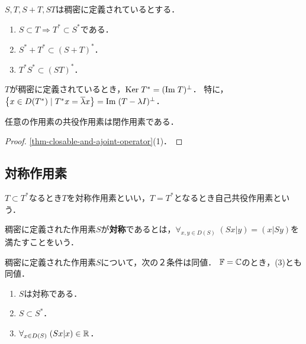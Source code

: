 \documentclass[uplatex,dvipdfmx]{jsreport}
\begin{document}
\begin{lemma}
    $S,T,S+T,ST$は稠密に定義されているとする．
    \begin{enumerate}
        \item $S\subset T\Rightarrow T^*\subset S^*$である．
        \item $S^*+T^*\subset(S+T)^*$．
        \item $T^*S^*\subset(ST)^*$．
    \end{enumerate}
\end{lemma}

\begin{lemma}
    $T$が稠密に定義されているとき，$\mathrm{Ker}\; T^*=(\mathrm{Im}\; T)^\perp$．
    特に，$\left\{x\in D(T^*)\mid T^*x=\overline{\lambda}x\right\}=\mathrm{Im}\;(T-\lambda I)^\perp$．
\end{lemma}

\begin{lemma}
    任意の作用素の共役作用素は閉作用素である．
\end{lemma}
\begin{proof}
    \ref{thm-closable-and-ajoint-operator}(1)．
\end{proof}

\subsection{対称作用素}

\begin{tcolorbox}[colframe=ForestGreen, colback=ForestGreen!10!white,breakable,colbacktitle=ForestGreen!40!white,coltitle=black,fonttitle=\bfseries\sffamily,
title=]
    $T\subset T^*$なるとき$T$を対称作用素といい，$T=T^*$となるとき自己共役作用素という．
\end{tcolorbox}

\begin{definition}[symmetric]
    稠密に定義された作用素$S$が\textbf{対称}であるとは，$\forall_{x,y\in D(S)}\;(Sx|y)=(x|Sy)$を満たすことをいう．
\end{definition}

\begin{lemma}[対称作用素の随伴による特徴付け]
    稠密に定義された作用素$S$について，次の２条件は同値．
    $\mathbb{F}=\mathbb{C}$のとき，(3)とも同値．
    \begin{enumerate}
        \item $S$は対称である．
        \item $S\subset S^*$．
        \item $\forall_{x\in D(S)}\;(Sx|x)\in\mathbb{R}$．
    \end{enumerate}
\end{lemma}
\end{document}
